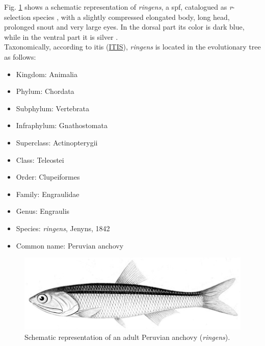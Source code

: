 Fig. \ref{Chap1Engraulis_ringens} shows a schematic representation of \textit{\gls{ringens}}, a \acrshort{spf}, catalogued as \textit{r}-selection species \citep{Pianka1970}, with a slightly compressed elongated body, long head, prolonged snout and very large eyes. In the dorsal part its color is dark blue, while in the ventral part it is silver \citep{Whit1988}.\\

Taxonomically, according to \acrlong{itis} (\href{https://www.itis.gov/}{ITIS}), \textit{\gls{ringens}} is located in the evolutionary tree as follows:\\

\begin{itemize}
  \centering
  \item Kingdom: Animalia
  \item Phylum: Chordata
  \item Subphylum: Vertebrata
  \item Infraphylum: Gnathostomata
  \item Superclass: Actinopterygii
  \item Class: Teleostei
  \item Order: Clupeiformes
  \item Family: Engraulidae
  \item Genus: Engraulis
  \item Species: \textit{\gls{ringens}}, Jenyns, 1842
  \item Common name: Peruvian anchovy
\end{itemize}

\begin{figure}[!]
	\includegraphics[width=1.0\textwidth]{figures/Chap1Engraulis_ringens.jpg}
	\centering
	\caption{Schematic representation of an adult Peruvian anchovy (\textit{\gls{ringens}}).}
	\label{Chap1Engraulis_ringens}
\end{figure}

